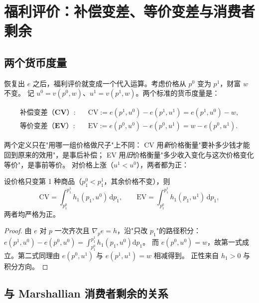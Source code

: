 \section{福利评价：补偿变差、等价变差与消费者剩余}

\subsection{两个货币度量}

恢复出 $e$ 之后，福利评价就变成一个代入运算。考虑价格从 $p^0$ 变为 $p^1$，财富 $w$ 不变。
记 $u^0=v(p^0,w)$、$u^1=v(p^1,w)$。两个标准的货币度量是：

\begin{definition}[补偿变差与等价变差]\label{def:cv-ev}
\begin{align*}
\textbf{补偿变差（CV）}:\quad & \mathrm{CV}:=e(p^1,u^0)-e(p^1,u^1)=e(p^1,u^0)-w,\\
\textbf{等价变差（EV）}:\quad & \mathrm{EV}:=e(p^0,u^0)-e(p^0,u^1)=w-e(p^0,u^1).
\end{align*}
\end{definition}

两个定义只在"用哪一组价格做尺子"上不同：
CV 用\emph{新}价格衡量"要补多少钱才能回到原来的效用"，是事后补偿；
EV 用\emph{旧}价格衡量"多少收入变化与这次价格变化等价"，是事前等价。
对价格上涨（$u^1<u^0$），两者都为正：

\begin{proposition}[积分表示]\label{prop:cv-ev-integral}
设价格只变第 1 种商品（$p^0_1<p^1_1$，其余价格不变），则
\[
 \mathrm{CV}=\int_{p^0_1}^{p^1_1}h_1(p_1,u^0)\,\mathrm dp_1,
 \qquad
 \mathrm{EV}=\int_{p^0_1}^{p^1_1}h_1(p_1,u^1)\,\mathrm dp_1,
\]
两者均严格为正。
\end{proposition}

\begin{proof}
由 $e$ 对 $p$ 一次齐次且 $\nabla_pe=h$，沿"只改 $p_1$"的路径积分：
$e(p^1,u^0)-e(p^0,u^0)=\int_{p^0_1}^{p^1_1}h_1(p_1,u^0)\mathrm dp_1$。
而 $e(p^0,u^0)=w$，故第一式成立。第二式同理由 $e(p^0,u^1)$ 与 $e(p^1,u^1)=w$ 相减得到。
正性来自 $h_1>0$ 与积分方向。
\end{proof}

\subsection{与 Marshallian 消费者剩余的关系}

